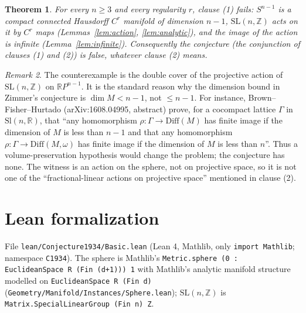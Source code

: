 \documentclass[11pt]{article}
\newtheorem{theorem}{Theorem}
\theoremstyle{definition}
\theoremstyle{remark}
\newtheorem{remark}[theorem]{Remark}
\renewcommand{\_}{\oldus\allowbreak}
\newcommand{\Z}{\mathbb{Z}}
\newcommand{\R}{\mathbb{R}}
\newcommand{\SL}{\mathrm{SL}}
\begin{document}
\begin{theorem}\label{thm:main}
For every $n\ge 3$ and every regularity $r$, clause (1) fails: $S^{n-1}$ is a compact connected Hausdorff
$C^r$ manifold of dimension $n-1$, $\SL(n,\Z)$ acts on it by $C^r$ maps (Lemmas~\ref{lem:action},
\ref{lem:analytic}), and the image of the action is infinite (Lemma~\ref{lem:infinite}). Consequently the
conjecture (the conjunction of clauses (1) and (2)) is false, whatever clause (2) means.
\end{theorem}

\begin{remark}
The counterexample is the double cover of the projective action of $\SL(n,\Z)$ on $\R P^{n-1}$. It is the
standard reason why the dimension bound in Zimmer's conjecture is $\dim M < n-1$, not $\le n-1$. For
instance, Brown--Fisher--Hurtado (arXiv:1608.04995, abstract) prove, for a cocompact lattice
$\Gamma$ in $\mathrm{Sl}(n,\R)$, that ``any homomorphism $\rho\colon\Gamma\rightarrow\mathrm{Diff}(M)$
has finite image if the dimension of $M$ is less than $n-1$ and that any homomorphism
$\rho\colon\Gamma\rightarrow\mathrm{Diff}(M,\omega)$ has finite image if the dimension of $M$ is less
than $n$''. Thus a volume-preservation hypothesis would change the problem; the conjecture has none.
The witness is an action on the sphere, not on projective space, so it is not one of the
``fractional-linear actions on projective space'' mentioned in clause (2).
\end{remark}

\section{Lean formalization}

File \texttt{lean/Conjecture1934/Basic.lean} (Lean 4, Mathlib, only \texttt{import Mathlib}; namespace
\texttt{C1934}). The sphere is Mathlib's \texttt{Metric.sphere (0 : EuclideanSpace R (Fin (d+1))) 1}
with Mathlib's analytic manifold structure modelled on \texttt{EuclideanSpace R (Fin d)}
(\texttt{Geometry/Manifold/Instances/Sphere.lean}); $\SL(n,\Z)$ is
\texttt{Matrix.SpecialLinearGroup (Fin n) Z}.
\end{document}
